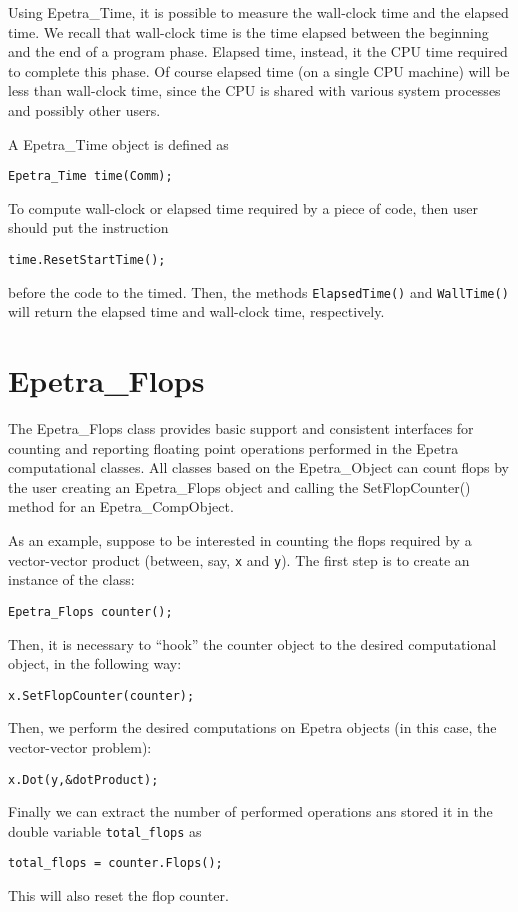 Using Epetra\_Time, it is possible to measure the wall-clock time and
the elapsed time. We recall that wall-clock time is the time elapsed
between the beginning and the end of a program phase. Elapsed time,
instead, it the CPU time required to complete this phase. Of course
elapsed time (on a single CPU machine) will be less than wall-clock
time, since the CPU is shared with various system processes and possibly
other users.

A Epetra\_Time object is defined as
\begin{verbatim}
Epetra_Time time(Comm);
\end{verbatim}
To compute wall-clock or elapsed time required by a piece of code,
then user should put the instruction
\begin{verbatim}
time.ResetStartTime();
\end{verbatim}
before the code to the timed. Then, 
the methods \verb!ElapsedTime()! and \verb!WallTime()! will return the
elapsed time and wall-clock time, respectively.


\section{Epetra\_Flops}
\label{sec:flops}

The Epetra\_Flops class provides basic support and consistent interfaces
for counting and reporting floating point operations performed in the
Epetra computational classes. All classes based on the Epetra\_Object can
count flops by the user creating an Epetra\_Flops object and calling the
SetFlopCounter() method for an Epetra\_CompObject.

As an example, suppose to be interested in counting the flops required
by a vector-vector product (between, say, \verb!x! and \verb!y!).
The first step is to create an instance of the class:
\begin{verbatim}
Epetra_Flops counter();
\end{verbatim}
Then, it is necessary to ``hook'' the counter object to the desired
computational object, in the following way:
\begin{verbatim}
x.SetFlopCounter(counter);
\end{verbatim}
Then, we perform the desired computations on Epetra objects (in this
case, the vector-vector problem):
\begin{verbatim}
x.Dot(y,&dotProduct);
\end{verbatim}
Finally we can extract the number of performed operations ans stored it
in the double variable \verb!total_flops! as
\begin{verbatim}
total_flops = counter.Flops();
\end{verbatim}
This will also reset the flop counter. 


